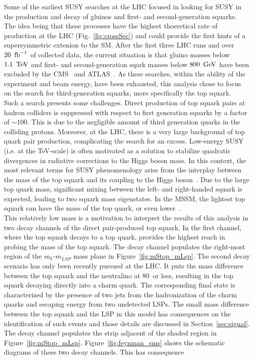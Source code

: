 \indent Some of the earliest SUSY searches at the LHC focused in 
looking for SUSY in the production and decay of gluinos and first- and 
second-generation squarks. The idea being that these processes have the highest 
thoeretical rate of production at the LHC (Fig.~\ref{fig:crossSec}) and could provide the first hints of a 
supersymmetric extenion to the SM. After the first three LHC runs and over $20~\mbox{\ensuremath{\,\text{fb}^\text{$-$1}}}$ of
collected data, the current situation is that gluino masses below $1.1~\,\text{Te\hspace{-.08em}V}$ and first- and 
second-generation sqark masses below $800~\,\text{Ge\hspace{-.08em}V}$ have been excluded by the CMS~\cite{cms-susy} 
and ATLAS~\cite{atlas-susy}. As these searches, within the ability of the experiment and beam energy,
have been exhausted, this analysis chose to focus on the search for third-generation 
squarks, more specifically the top squark.\\
\indent Such a search presents some challenges. Direct production of top squark pairs at hadron 
colliders is suppressed with respect to first generation squarks by a factor of $\sim100$. This is 
due to the negligible amount of third generation quarks in the colliding protons. Moreover, at 
the LHC, there is a very large background of top quark pair production, complicating the search for an excess.
Low-energy SUSY (i.e. at the TeV-scale) is often motivated as a solution to 
stabilize quadratic divergences in radiative corrections to the Higgs boson mass. In this
context, the most relevant terms for SUSY phenomenology arise from the interplay between 
the mass of the top squark and its coupling to the Higgs boson~\cite{Agashe:2014kda}. 
Due to the large top quark mass, significant mixing between the left- and right-handed squark
is expected, leading to two squark mass eigenstates. In the MSSM, the lightest top squark
can have the mass of the top quark, or even lower~\cite{Martin:1997ns}.\\
\indent This relatively low mass is a motivation to interpret the results of this 
analysis in two decay channels of the direct pair-produced top squark. 
In the first channel, where the top squark decays to a top quark, provides the highest reach 
in probing the mass of the top squark. The decay channel populates the right-most region of the 
$m_{\tilde{\rm t}}$-$m_{LSP}$ mass plane in Figure~\ref{fig:mStop_mLsp}.
The second decay scenario has only been recently pursued at the LHC. It puts 
the mass difference between the top squark and the neutralino at 80~\GeV or 
less, resulting in the top squark decaying directly into a charm quark. 
The corresponding final state is characterized by the presence of two jets from 
the hadronization of the charm quarks and escaping energy from two undetected LSPs.
The small mass difference between the top squark and the LSP in this model has consequences on the 
identification of such events and those details are discussed in Section~\ref{sec:signal}.
The decay channel populates the strip adjacent of the shaded region in Figure~\ref{fig:mStop_mLsp}.
Figure~\ref{fig:feynman_sms} shows the schematic diagrams of these two decay channels. This
has consequence

